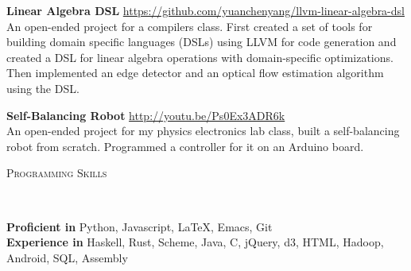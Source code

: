 \documentclass[9pt]{article}
\newenvironment{changemargin}[2]{%
  \begin{list}{}{%
      \setlength{\topsep}{0pt}%
      \setlength{\leftmargin}{#1}%
      \setlength{\rightmargin}{#2}%
      \setlength{\listparindent}{\parindent}%
      \setlength{\itemindent}{\parindent}%
      \setlength{\parsep}{\parskip}%
    }%
  \item[]}{\end{list}
}
\newcommand{\lineover}{
  \begin{changemargin}{-0.05in}{-0.05in}
    \vspace*{-8pt}
    \hrulefill \\
    \vspace*{-2pt}
  \end{changemargin}
}
\newcommand{\header}[1]{
  \begin{changemargin}{-0.5in}{-0.5in}
    \scshape{#1}\\
    \lineover
  \end{changemargin}
}
\newenvironment{body} {
  \vspace*{-16pt}
  \begin{changemargin}{-0.25in}{-0.5in}
  }
  {\end{changemargin}
}
\begin{document}
\begin{body}
  \vspace{14pt}

  \textbf{Linear Algebra DSL} \hfill \url{https://github.com/yuanchenyang/llvm-linear-algebra-dsl} \\
  An open-ended project for a compilers class. First created a set of tools for
  building domain specific languages (DSLs) using LLVM for code generation and
  created a DSL for linear algebra operations with domain-specific
  optimizations. Then implemented an edge detector and an optical flow
  estimation algorithm using the DSL.  \medskip

  \textbf{Self-Balancing Robot} \hfill \url{http://youtu.be/Ps0Ex3ADR6k} \\
  An open-ended project for my physics electronics lab class, built a
  self-balancing robot from scratch. Programmed a controller for it on an
  Arduino board. \\
  \medskip

\end{body}

\smallskip


\header{Programming Skills}

\begin{body}
  \vspace{14pt}
  \textbf{Proficient in} Python, Javascript, \LaTeX, Emacs, Git \\
  \textbf{Experience in} Haskell, Rust, Scheme, Java, C, jQuery, d3, HTML, Hadoop, Android, SQL, Assembly
\end{body}

\smallskip

\end{document}

